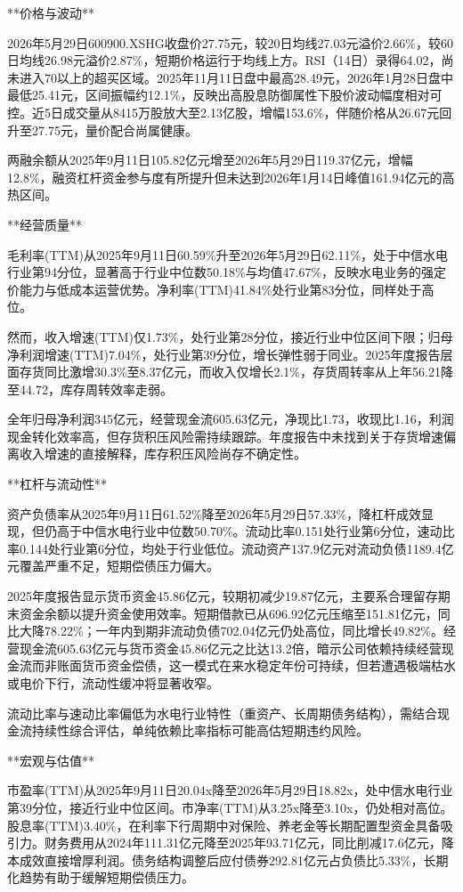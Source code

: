 \documentclass[12pt,a4paper]{article}
\begin{document}
**价格与波动**

2026年5月29日600900.XSHG收盘价27.75元，较20日均线27.03元溢价2.66\%，较60日均线26.98元溢价2.87\%，短期价格运行于均线上方。RSI（14日）录得64.02，尚未进入70以上的超买区域。2025年11月11日盘中最高28.49元，2026年1月28日盘中最低25.41元，区间振幅约12.1\%，反映出高股息防御属性下股价波动幅度相对可控。近5日成交量从8415万股放大至2.13亿股，增幅153.6\%，伴随价格从26.67元回升至27.75元，量价配合尚属健康。

两融余额从2025年9月11日105.82亿元增至2026年5月29日119.37亿元，增幅12.8\%，融资杠杆资金参与度有所提升但未达到2026年1月14日峰值161.94亿元的高热区间。

**经营质量**

毛利率(TTM)从2025年9月11日60.59\%升至2026年5月29日62.11\%，处于中信水电行业第94分位，显著高于行业中位数50.18\%与均值47.67\%，反映水电业务的强定价能力与低成本运营优势。净利率(TTM)41.84\%处行业第83分位，同样处于高位。

然而，收入增速(TTM)仅1.73\%，处行业第28分位，接近行业中位区间下限；归母净利润增速(TTM)7.04\%，处行业第39分位，增长弹性弱于同业。2025年度报告层面存货同比激增30.3\%至8.37亿元，而收入仅增长2.1\%，存货周转率从上年56.21降至44.72，库存周转效率走弱。

全年归母净利润345亿元，经营现金流605.63亿元，净现比1.73，收现比1.16，利润现金转化效率高，但存货积压风险需持续跟踪。年度报告中未找到关于存货增速偏离收入增速的直接解释，库存积压风险尚存不确定性。

**杠杆与流动性**

资产负债率从2025年9月11日61.52\%降至2026年5月29日57.33\%，降杠杆成效显现，但仍高于中信水电行业中位数50.70\%。流动比率0.151处行业第6分位，速动比率0.144处行业第6分位，均处于行业低位。流动资产137.9亿元对流动负债1189.4亿元覆盖严重不足，短期偿债压力偏大。

2025年度报告显示货币资金45.86亿元，较期初减少19.87亿元，主要系合理留存期末资金余额以提升资金使用效率。短期借款已从696.92亿元压缩至151.81亿元，同比大降78.22\%；一年内到期非流动负债702.04亿元仍处高位，同比增长49.82\%。经营现金流605.63亿元与货币资金45.86亿元之比达13.2倍，暗示公司依赖持续经营现金流而非账面货币资金偿债，这一模式在来水稳定年份可持续，但若遭遇极端枯水或电价下行，流动性缓冲将显著收窄。

流动比率与速动比率偏低为水电行业特性（重资产、长周期债务结构），需结合现金流持续性综合评估，单纯依赖比率指标可能高估短期违约风险。

**宏观与估值**

市盈率(TTM)从2025年9月11日20.04x降至2026年5月29日18.82x，处中信水电行业第39分位，接近行业中位区间。市净率(TTM)从3.25x降至3.10x，仍处相对高位。股息率(TTM)3.40\%，在利率下行周期中对保险、养老金等长期配置型资金具备吸引力。财务费用从2024年111.31亿元降至2025年93.71亿元，同比削减17.6亿元，降本成效直接增厚利润。债务结构调整后应付债券292.81亿元占负债比5.33\%，长期化趋势有助于缓解短期偿债压力。
\end{document}
